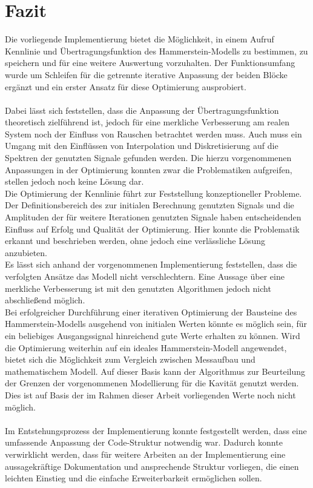 \documentclass[../Report.tex]{subfiles}
\begin{document}
\chapter{Fazit}
\label{chap:fazit}
Die vorliegende Implementierung bietet die Möglichkeit, in einem Aufruf Kennlinie und Übertragungsfunktion des Hammerstein-Modells zu bestimmen, zu speichern und für eine weitere Auswertung vorzuhalten.
Der Funktionsumfang wurde um Schleifen für die getrennte iterative Anpassung der beiden Blöcke ergänzt und ein erster Ansatz für diese Optimierung ausprobiert.
\\
\\ 
Dabei lässt sich feststellen, dass die Anpassung der Übertragungsfunktion theoretisch zielführend ist, jedoch für eine merkliche Verbesserung am realen System noch der Einfluss von Rauschen betrachtet werden muss. Auch muss ein Umgang mit den Einflüssen von Interpolation und Diskretisierung auf die Spektren der genutzten Signale gefunden werden. Die hierzu vorgenommenen Anpassungen in der Optimierung konnten zwar die Problematiken aufgreifen, stellen jedoch noch keine Lösung dar.
\\
Die Optimierung der Kennlinie führt zur Feststellung konzeptioneller Probleme. Der Definitionsbereich des zur initialen Berechnung genutzten Signals und die Amplituden der für weitere Iterationen genutzten Signale haben entscheidenden Einfluss auf Erfolg und Qualität der Optimierung. Hier konnte die Problematik erkannt und beschrieben werden, ohne jedoch eine verlässliche Lösung anzubieten. 
\\
Es lässt sich anhand der vorgenommenen Implementierung feststellen, dass die verfolgten Ansätze das Modell nicht verschlechtern. Eine Aussage über eine merkliche Verbesserung ist mit den genutzten Algorithmen jedoch nicht abschließend möglich. 
\\
Bei erfolgreicher Durchführung einer iterativen Optimierung der Bausteine des Hammerstein-Modells ausgehend von initialen Werten könnte es möglich sein, für ein beliebiges Ausgangssignal hinreichend gute Werte erhalten zu können. Wird die Optimierung weiterhin auf ein ideales Hammerstein-Modell angewendet, bietet sich die Möglichkeit zum Vergleich zwischen Messaufbau und mathematischem Modell. Auf dieser Basis kann der Algorithmus zur Beurteilung der Grenzen der vorgenommenen Modellierung für die Kavität genutzt werden.
Dies ist auf Basis der im Rahmen dieser Arbeit vorliegenden Werte noch nicht möglich. 
\\
\\
Im Entstehungsprozess der Implementierung konnte festgestellt werden, dass eine umfassende Anpassung der Code-Struktur notwendig war. Dadurch konnte verwirklicht werden, dass für weitere Arbeiten an der Implementierung eine aussagekräftige Dokumentation und ansprechende Struktur vorliegen, die einen leichten Einstieg und die einfache Erweiterbarkeit ermöglichen sollen.
\end{document}

